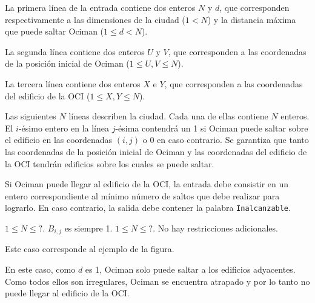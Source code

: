 \documentclass{oci}
\begin{document}
\begin{inputDescription}
La primera línea de la entrada contiene dos enteros $N$ y $d$, que corresponden
respectivamente a las dimensiones de la ciudad ($1 < N$) y la distancia máxima
que puede saltar Ociman ($1 \le d < N$).

La segunda línea contiene dos enteros $U$ y $V$, que corresponden a las
coordenadas de la posición inicial de Ociman ($1 \le U, V \le N$).

La tercera línea contiene dos enteros $X$ e $Y$, que corresponden a las
coordenadas del edificio de la OCI ($1 \le X, Y \le N$).

Las siguientes $N$ líneas describen la ciudad.
Cada una de ellas contiene $N$ enteros.
El $i$-ésimo entero en la línea $j$-ésima contendrá un 1 si Ociman puede saltar
sobre el edificio en las coordenadas $(i, j)$ o 0 en caso contrario.
Se garantiza que tanto las coordenadas de la posición inicial de Ociman y las
coordenadas del edificio de la OCI tendrán edificios sobre los cuales se
puede saltar.
\end{inputDescription}

\begin{outputDescription}
Si Ociman puede llegar al edificio de la OCI, la entrada debe consistir
en un entero correspondiente al mínimo número de saltos que debe realizar para
lograrlo.
En caso contrario, la salida debe contener la palabra \verb-Inalcanzable-.
\end{outputDescription}

\begin{scoreDescription}
   $1 \le N \le ?$. $B_{i,j}$ es siempre 1.
   $1 \le N \le ?$. No hay restricciones adicionales.
\end{scoreDescription}

\begin{sampleDescription}
Este caso corresponde al ejemplo de la figura.

En este caso, como $d$ es 1, Ociman solo puede saltar a los edificios adyacentes.
Como todos ellos son irregulares, Ociman se encuentra atrapado y por lo tanto no
puede llegar al edificio de la OCI.
\end{sampleDescription}
\end{document}
